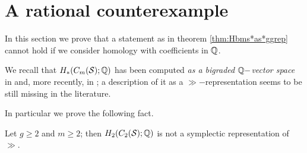\section{A rational counterexample}
In this section we prove that a statement as in theorem \ref{thm:Hbms*as*ggrep}
cannot hold if we consider homology with coefficients in $\mathbb{Q}$.

We recall that $H_*(C_m(\mathcal{S});\mathbb{Q})$ has been computed \emph{as a bigraded $\mathbb{Q}-$vector space}
in \cite{BCM} and, more recently, in \cite{Knudson}; a description of it as a
$\gg-$representation seems to be still missing in the literature.

In particular we prove the following fact.
\begin{thm}
 \label{thm:counterexample}
 Let $g\geq 2$ and $m\geq 2$; then $H_2(C_2(\mathcal{S});\mathbb{Q})$ is not a symplectic
 representation of $\gg$.
\end{thm}
